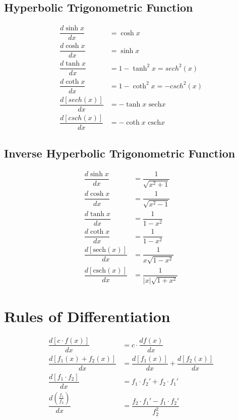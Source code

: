 \documentclass[../main.tex]{subfile}
\begin{document}
    \subsection{Hyperbolic Trigonometric Function}
    \begin{align}
        \dfrac{d \sinh x}{dx} & = \cosh x\\
        \dfrac{d \cosh x}{dx} & = \sinh x\\
        \dfrac{d \tanh x}{dx} & = 1 - \tanh^2 x = sech^2 (x)\\
        \dfrac{d \coth x}{dx} & = 1 - \coth^2 x = -csch^2 (x)\\
        \dfrac{d[sech(x)]}{dx} & = -\tanh x \text{ sech}x\\
        \dfrac{d[csch(x)]}{dx} & = -\coth x \text{ csch}x
    \end{align}

    \subsection{Inverse Hyperbolic Trigonometric Function}
    \begin{align}
        \dfrac{d\sinh x}{dx} & = \dfrac{1}{\sqrt{x^2 + 1}}\\
        \dfrac{d\cosh x}{dx} & = \dfrac{1}{\sqrt{x^2 - 1}}\\
        \dfrac{d\tanh x}{dx} & = \dfrac{1}{1 - x^2}\\
        \dfrac{d\coth x}{dx} & = \dfrac{1}{1 - x^2}\\
        \dfrac{d[\text{sech} (x)]}{dx} & = \dfrac{1}{x\sqrt{1 - x^2}}\\
        \dfrac{d[\text{csch} (x)]}{dx} & = \dfrac{1}{\lvert x \rvert \sqrt{1 + x^2}}
    \end{align}

    \section{Rules of Differentiation}
    \begin{align}
        \dfrac{d[c \cdot f(x)]}{dx} & = c \cdot \dfrac{df(x)}{dx}\\
        \dfrac{d[f_1(x) + f_2(x)]}{dx} & = \dfrac{d[f_1(x)]}{dx} + \dfrac{d[f_2(x)]}{dx} \\
        \dfrac{d[f_1 \cdot f_2]}{dx} & = f_1 \cdot f_2' + f_2 \cdot f_1'\\
        \dfrac{d \left(\frac{f_1}{f_2} \right)}{dx} & = \dfrac{f_2 \cdot f_1' - f_1 \cdot f_2'}{f_2^2}
    \end{align}
\end{document}
